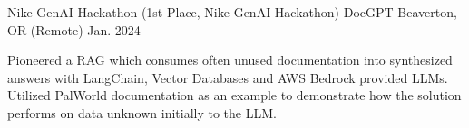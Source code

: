 


\begin{cventries}


\cventry
{Nike GenAI Hackathon} %
{(1st Place, Nike GenAI Hackathon) DocGPT} %
{Beaverton, OR (Remote)} %
{Jan. 2024} %
{ %
\begin{cvitems}
\item {Pioneered a RAG which consumes often unused documentation into synthesized answers with LangChain, Vector Databases and AWS Bedrock provided LLMs. Utilized PalWorld documentation as an example to demonstrate how the solution performs on data unknown initially to the LLM.}
\end{cvitems}
}




\end{cventries}
